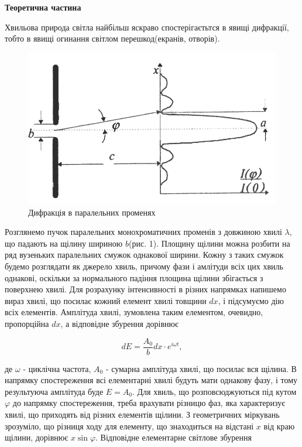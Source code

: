 \begin{center}
    \Large{\textbf{Теоретична частина}}    
\end{center}

\vspace{1mm}

Хвильова природа світла найбільш яскраво спостерігаєтьтся в явищі
дифракції, тобто в явищі огинання світлом перешкод(екранів, отворів).

\begin{figure}    
    \centering
    \includegraphics[width=.5\textwidth]{assets/diffraction.png}
    \caption{Дифракція в паралельних променях}
\end{figure}

Розглянемо пучок паралельних монохроматичних променів з 
довжиною хвилі $\lambda$, що падають на щілину шириною $b$(рис. 1).
Площину щілини можна розбити на ряд вузеньких паралельних
смужок однакової ширини. Кожну з таких смужок будемо розглядати
як джерело хвиль, причому фази і амлітуди всіх цих хвиль однакові,
оскільки за нормального падіння площина щілини збігається 
з поверхнею хвилі. Для розрахунку інтенсивності в різних
напрямках напишемо вираз хвилі, що посилає кожний елемент хвилі
товщини $dx$, і підсумуємо дію всіх елементів. Амплітуда хвилі,
зумовлена таким елементом, очевидно, пропорційна $dx$,
а відповідне збурення дорівнює

\begin{equation} \label{eq:1}
    dE = \frac{A_0}{b} dx \cdot e^{i \omega t},
\end{equation}

де $\omega$ - циклічна частота, $A_0$ - сумарна амплітуда
хвилі, що посилає вся щілина. В напрямку спостереження всі
елементарні хвилі будуть мати однакову фазу, і тому результуюча амплітуда
буде $E=A_0$. Для хвиль, що розповсюджуються під кутом $\varphi$
до напрямку спостереження, треба врахувати різницю фаз, яка 
характеризує хвилі, що приходять від різних елементів щілини.
З геометричних міркувань зрозуміло, що різниця ходу для елементу,
що знаходиться на відстані $x$ від краю щілини, дорівнює $x\sin{\varphi}$.
Відповідне елементарне світлове збурення

